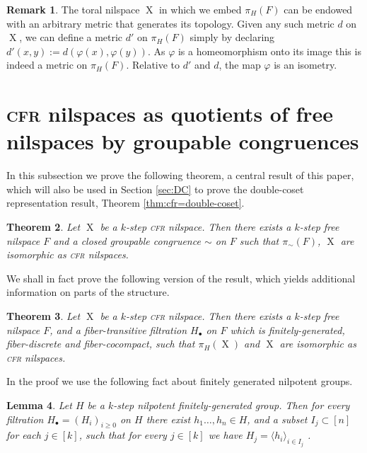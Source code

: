 \documentclass[a4paper,12pt,reqno]{amsart}
\newtheorem{theorem}{Theorem}[section]
\newtheorem{lemma}[theorem]{Lemma}
\theoremstyle{definition}
\newtheorem{remark}[theorem]{Remark}
\DeclareMathOperator{\ns}{X}
\begin{document}
\begin{remark}\label{rem:isometric-embedding}
The toral nilspace $\ns$ in which we embed $\pi_H(F)$ can be endowed with an arbitrary metric that generates its topology. Given any such metric $d$ on $\ns$, we can define a metric $d'$ on $\pi_H(F)$ simply by declaring $d'(x,y):=d(\varphi(x),\varphi(y))$. As $\varphi$ is a homeomorphism onto its image this is indeed a metric on $\pi_H(F)$. Relative to $d'$ and $d$, the map $\varphi$ is an isometry.
\end{remark}






\section{\textsc{cfr} nilspaces as quotients of free nilspaces by groupable congruences}\label{sec:groupequivrep}
\noindent In this subsection we prove the following theorem, a central result of this paper, which will also be used in Section \ref{sec:DC} to prove the double-coset representation result, Theorem \ref{thm:cfr=double-coset}.


\begin{theorem}\label{thm:gpcongrep}
Let $\ns$ be a $k$-step \textsc{cfr} nilspace. Then there exists a $k$-step free nilspace $F$ and a closed groupable congruence $\sim$ on $F$ such that $\pi_\sim(F)$, $\ns$ are isomorphic as \textsc{cfr} nilspaces.
\end{theorem}

We shall in fact prove the following version of the result,  which yields additional information on parts of the structure.

\begin{theorem}\label{thm:groupequivrep}
Let $\ns$ be a $k$-step \textsc{cfr} nilspace. Then there exists a $k$-step free nilspace $F$, and a fiber-transitive filtration $H_\bullet$ on $F$ which is  finitely-generated, fiber-discrete and fiber-cocompact, such that $\pi_H(\ns)$ and  $\ns$ are isomorphic as \textsc{cfr} nilspaces.
\end{theorem}

In the proof we use the following fact about finitely generated nilpotent groups.
\begin{lemma}\label{lem:noeth-group}
Let $H$ be a $k$-step nilpotent finitely-generated group. Then for every filtration $H_\bullet=(H_i)_{i\ge 0}$ on $H$ there exist $h_1\ldots,h_n\in H$, and a subset $I_j\subset [n]$ for each $j\in[k]$, such that for every $j\in[k]$ we have $H_j=\langle h_{i}\rangle_{i\in I_j}$ .
\end{lemma}
\end{document}
